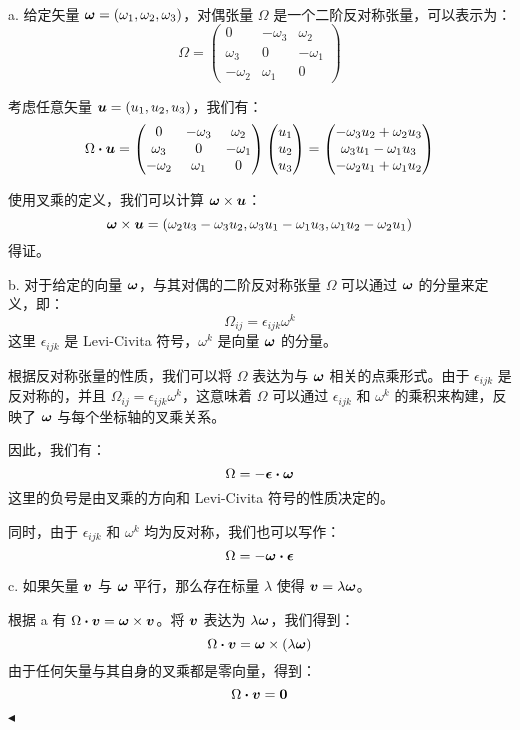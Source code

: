 \documentclass[11pt]{article}
\newenvironment{question}[2][Question]{\begin{trivlist}
\item[\hskip \labelsep {\bfseries #1}\hskip \labelsep {\bfseries #2.}]}{\hfill$\blacktriangleleft$\end{trivlist}}
\begin{document}
    \begin{question}{7 (9') (矢量对偶张量)}~    

    a.
    给定矢量 $\vb*{\omega} = (\omega_1, \omega_2, \omega_3)$，对偶张量 $\Omega$ 是一个二阶反对称张量，可以表示为：
    \[ \Omega = \begin{pmatrix} 0 & -\omega_3 & \omega_2 \\ \omega_3 & 0 & -\omega_1 \\ -\omega_2 & \omega_1 & 0 \end{pmatrix} \]


    考虑任意矢量 $\vb*{u} = (u_1, u_2, u_3)$，我们有：
    \[ \Omega \vdot \vb*{u} = \begin{pmatrix} 0 & -\omega_3 & \omega_2 \\ \omega_3 & 0 & -\omega_1 \\ -\omega_2 & \omega_1 & 0 \end{pmatrix} \begin{pmatrix} u_1 \\ u_2 \\ u_3 \end{pmatrix} = \begin{pmatrix} -\omega_3 u_2 + \omega_2 u_3 \\ \omega_3 u_1 - \omega_1 u_3 \\ -\omega_2 u_1 + \omega_1 u_2 \end{pmatrix} \]


    使用叉乘的定义，我们可以计算 $\vb*{\omega} \times \vb*{u}$：
    \[ \vb*{\omega} \times \vb*{u} = (\omega_2 u_3 - \omega_3 u_2, \omega_3 u_1 - \omega_1 u_3, \omega_1 u_2 - \omega_2 u_1) \]
    得证。

    b. 对于给定的向量 \(\vb*{\omega}\)，与其对偶的二阶反对称张量 \(\Omega\) 可以通过 \(\vb*{\omega}\) 的分量来定义，即：
    \[ \Omega_{ij} = \epsilon_{ijk}\omega^k \]
    这里 \(\epsilon_{ijk}\) 是 Levi-Civita 符号，\(\omega^k\) 是向量 \(\vb*{\omega}\) 的分量。
    
    根据反对称张量的性质，我们可以将 \(\Omega\) 表达为与 \(\vb*{\omega}\) 相关的点乘形式。由于 \(\epsilon_{ijk}\) 是反对称的，并且 \(\Omega_{ij} = \epsilon_{ijk}\omega^k\)，这意味着 \(\Omega\) 可以通过 \(\epsilon_{ijk}\) 和 \(\omega^k\) 的乘积来构建，反映了 \(\vb*{\omega}\) 与每个坐标轴的叉乘关系。
    
    因此，我们有：
    \[ \Omega = -\vb*{\epsilon} \vdot \vb*{\omega} \]
    这里的负号是由叉乘的方向和 Levi-Civita 符号的性质决定的。
    
    同时，由于 \(\epsilon_{ijk}\) 和 \(\omega^k\) 均为反对称，我们也可以写作：
    \[ \Omega = -\vb*{\omega} \vdot \vb*{\epsilon} \]

    c.
    如果矢量 $\vb*{v}$ 与 $\vb*{\omega}$ 平行，那么存在标量 $\lambda$ 使得 $\vb*{v} = \lambda \vb*{\omega}$。

    根据 a 有 $\Omega \vdot \vb*{v} = \vb*{\omega} \times \vb*{v}$。将 $\vb*{v}$ 表达为 $\lambda \vb*{\omega}$，我们得到：
    \[ \Omega \vdot \vb*{v} = \vb*{\omega} \times (\lambda \vb*{\omega}) \]
    由于任何矢量与其自身的叉乘都是零向量，得到：
    \[ \Omega \vdot \vb*{v} = \vb*{0} \]

\end{question}
\end{document}
